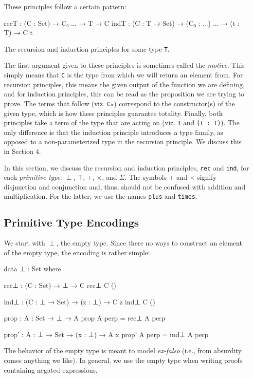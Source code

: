 \documentclass[12pt]{article}
\begin{document}
These principles follow a certain pattern:
\begin{center}
\begin{minipage}{0.9\textwidth}
\begin{code}
recT : (C : Set) → C₀ ... → T → C
indT : (C : T → Set) → (C₀ : ...) ... → (t : T) → C t
\end{code}
\end{minipage}

\begin{minipage}{0.7\textwidth}
\begin{small}
The recursion and induction principles for some type {\tt T}.
\end{small}
\end{minipage}
\end{center}
The first argument given to these principles is sometimes called the {\em motive}.
This simply means that {\tt C} is the type from which we will return an element
from. For recursion principles, this means the given output of the function we
are defining, and for induction principles, this can be read as the proposition
we are trying to prove. The terms that follow (viz. {\tt C₀}) correspond to the
constructor(s) of the given type, which is how these principles guarantee
totality. Finally, both principles take a term of the type that are acting on
(viz. {\tt T} and {\tt (t : T)}). The only difference is that the induction
principle introduces a type family, as opposed to a non-parameterized type in the
recursion principle. We discuss this in Section 4.

In this section, we discuss the recursion and induction principles, {\tt rec}
and {\tt ind}, for each {\em primitive type}: \(\perp\), \(\top\), +,
\(\times\), and \(\Sigma\). The symbols + and \(\times\) signify disjunction
and conjunction and, thus, should not be confused with addition and
multiplication. For the latter, we use the names {\tt plus} and {\tt times}.

\subsection*{Primitive Type Encodings}
We start with \(\perp\), the empty type. Since there no ways to construct
an element of the empty type, the encoding is rather simple:
\begin{center}
\begin{minipage}{0.9\textwidth}
\begin{code}
data ⊥ : Set where

rec⊥ : (C : Set) → ⊥ → C
rec⊥ C ()

ind⊥ : (C : ⊥ → Set) → (z : ⊥) → C z
ind⊥ C ()

prop : {A : Set} → ⊥ → A
prop {A} perp = rec⊥ A perp

prop' : {A : ⊥ → Set} → (x : ⊥) → A x
prop' {A} perp = ind⊥ A perp
\end{code}
\end{minipage}
\end{center}
The behavior of the empty type is meant to model {\it ex-falso} (i.e., from
absurdity comes anything we like). In general, we use the empty type when
writing proofs containing negated expressions.
\end{document}
